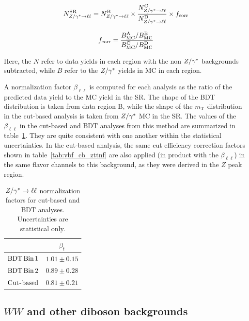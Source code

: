 \begin{equation}
N^{\rm SR}_{Z/\gamma^{\ast}\to\ell\ell} = N^{\rm B}_{Z/\gamma^{\ast}\to\ell\ell}  \times \frac{N^{\rm C}_{Z/\gamma^{\ast}\to\ell\ell}}{N^{\rm D}_{Z/\gamma^{\ast}\to\ell\ell} } \times f_{\rm corr}
\label{eqn:abcd}
\end{equation}

\begin{equation}
f_{\rm corr} = \frac{B_{\rm MC}^{\rm A}/B_{\rm MC}^{\rm B}}{B_{\rm MC}^{\rm C}/B_{\rm MC}^{\rm D}}
\label{eqn:nonclosure}
\end{equation}

Here, the $N$ refer to data yields in each region with the non $Z/\gamma^{\ast}$ backgrounds subtracted, while $B$ refer to the $Z/\gamma^{\ast}$ yields in MC in each region.

A normalization factor $\beta_{\ell\ell}$ is computed for each analysis as the ratio of the predicted data yield to the MC yield in the SR. The shape of the BDT distribution is taken from data region B, while the shape of the $m_{\textrm{\footnotesize\sc t}}$ distribution in the cut-based analysis is taken from $Z/\gamma^{\ast}$ MC in the SR. The values of the $\beta_{\ell\ell}$ in the cut-based and BDT analyses from this method are summarized in table~\ref{tab:vbf_sf_nf}. They are quite consistent with one another within the statistical uncertainties. In the cut-based analysis, the same cut efficiency correction factors shown in table~\ref{tab:vbf_cb_zttnf} are also applied (in product with the $\beta_{\ell\ell}$) in the same flavor channels to this background, as they were derived in the $Z$ peak region. 

\begin{table}[h!]
\centering
\captionsetup{justification=centering}
\begin{tabular}{|c|c|}
\hline
& $\beta_t$ \\ \hline
$\rm BDT\,Bin\,1$ & $1.01 \pm 0.15$ \\ \hline
$\rm BDT\,Bin\,2$ & $0.89 \pm 0.28$ \\ \hline
$\rm Cut$-$\rm based$ & $0.81 \pm 0.21$ \\ \hline
\end{tabular}
\caption{$Z/\gamma^{\ast} \to \ell\ell$ normalization factors for cut-based and BDT analyses. Uncertainties are statistical only.}
\label{tab:vbf_sf_nf}
\end{table}

\subsection{$WW$ and other diboson backgrounds}

